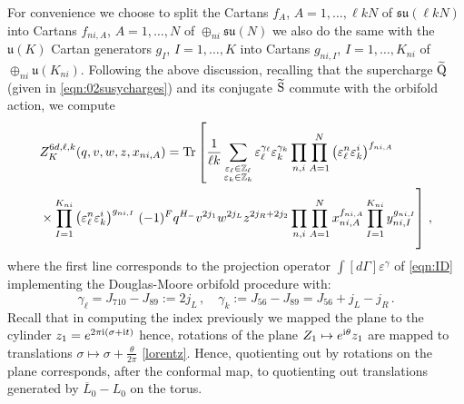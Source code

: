 \documentclass[main.tex]{subfiles}
\begin{document}
For convenience we choose to split the Cartans $f_A$, $A=1,\dots,\ell kN$ of $\mathfrak{su}(\ell kN)$ into Cartans $f_{ni,A}$, $A=1,\dots,N$ of $\oplus_{ni}\mathfrak{su}(N)$ we also do the same with the $\mathfrak{u}(K)$ Cartan generators $g_I$, $I=1,\dots, K$ into Cartans $g_{ni,I}$, $I=1,\dots,K_{ni}$ of $\oplus_{ni}\mathfrak{u}(K_{ni})$. Following the above discussion, recalling that the supercharge $\widetilde{\mathrm{Q}}$ (given in \eqref{eqn:02susycharges}) and its conjugate $\widetilde{\mathrm{S}}$ commute with the orbifold action, we compute
\begin{equation}\label{eqn:orbindex}
\begin{aligned}
&Z^{6d,\ell,k}_K(q,v,w,z,x_{ni,A})=\Tr\left[\frac{1}{\ell k}\sum_{\substack{\varepsilon_{\ell}\in\mathbb{Z}_{\ell}\\\varepsilon_{k}\in\mathbb{Z}_{k}}}\varepsilon_{\ell}^{\gamma_{\ell}}\varepsilon_k^{\gamma_k}\prod_{n,i}\prod_{A=1}^N\left(\varepsilon_{\ell}^n\varepsilon_k^i\right)^{f_{ni,A}}\right.\\
&\times\prod_{I=1}^{K_{ni}}\left(\varepsilon_{\ell}^n\varepsilon_k^i\right)^{g_{ni,I}}\left.\vphantom{\sum_{\substack{\varepsilon_{\ell}\in\mathbb{Z}_{\ell}\\\varepsilon_{k}\in\mathbb{Z}_{k}}}}(-1)^Fq^{H_-}v^{2j_1}w^{2j_L}z^{2j_R+2j_2}\prod_{n,i}\prod_{A=1}^Nx_{ni,A}^{f_{ni,A}}\prod_{I=1}^{K_{ni}}y_{ni,I}^{g_{ni,I}}\right]\,,
\end{aligned}
\end{equation}
where the first line corresponds to the projection operator $\int\left[d\Gamma\right]\varepsilon^{\gamma}$ of \eqref{eqn:ID} implementing the Douglas-Moore orbifold procedure with: 
\begin{equation}
\gamma_{\ell}=J_{710}-J_{89}:=2j_L \,,\quad \gamma_k:=J_{56}-J_{89}=J_{56}+j_L-j_R\,.
\end{equation}
Recall that in computing the index previously we mapped the plane to the cylinder $z_1=e^{2\pi\mathrm{i}\left(\sigma+\mathrm{i} t\right)}$ hence, rotations of the plane $Z_1\mapsto e^{\mathrm{i}\theta}z_1$ are mapped to translations $\sigma\mapsto\sigma+\frac{\theta}{2\pi}$ \eqref{lorentz}. Hence, quotienting out by rotations on the plane corresponds, after the conformal map, to quotienting out translations generated by $\overline{L}_0-L_0$ on the torus.
\end{document}
